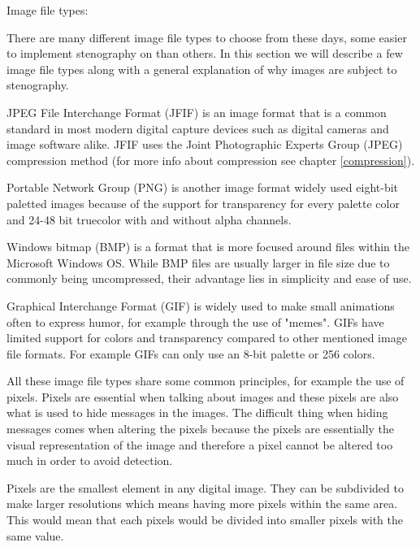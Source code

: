 Image file types:

There are many different image file types to choose from these days, some easier to implement stenography on than others. In this section we will describe a few image file types along with a general explanation of why images are subject to stenography.

JPEG File Interchange Format (JFIF) is an image format that is a common standard in most modern digital capture devices such as digital cameras and image software alike. JFIF uses the Joint Photographic Experts Group (JPEG) compression method (for more info about compression see chapter \ref{compression}).

Portable Network Group (PNG) is another image format widely used eight-bit paletted images because of the support for transparency for every palette color and 24-48 bit truecolor with and without alpha channels.

Windows bitmap (BMP) is a format that is more focused around files within the Microsoft Windows OS. While BMP files are usually larger in file size due to commonly being uncompressed, their advantage lies in simplicity and ease of use.

Graphical Interchange Format (GIF) is widely used to make small animations often to express humor, for example through the use of "memes". GIFs have limited support for colors and transparency compared to other mentioned image file formats. For example GIFs can only use an 8-bit palette or 256 colors.

All these image file types share some common principles, for example the use of pixels. Pixels are essential when talking about images and these pixels are also what is used to hide messages in the images. The difficult thing when hiding messages comes when altering the pixels because the pixels are essentially the visual representation of the image and therefore a pixel cannot be altered too much in order to avoid detection.

Pixels are the smallest element in any digital image. They can be subdivided to make larger resolutions which means having more pixels within the same area. This would mean that each pixels would be divided into smaller pixels with the same value.\cite{ThePixel}